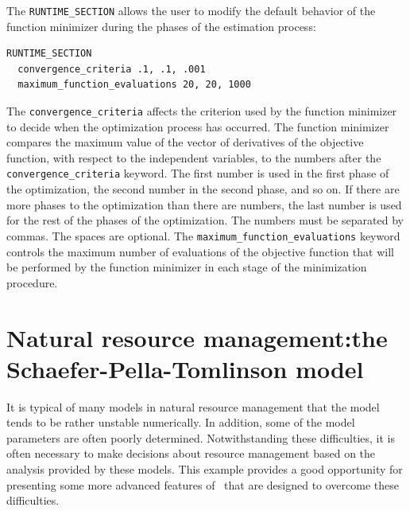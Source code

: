 \documentclass{admbmanual}
\begin{document}
The \texttt{RUNTIME\_SECTION} allows the user to modify the default behavior of
the function minimizer during the phases of the estimation process:
\begin{lstlisting}
RUNTIME_SECTION
  convergence_criteria .1, .1, .001
  maximum_function_evaluations 20, 20, 1000
\end{lstlisting}

The \texttt{convergence\_criteria} affects the criterion used by the function
minimizer to decide when the optimization process has occurred. The function
minimizer compares the maximum value of the vector of derivatives of the
objective function, with respect to the independent variables, to the numbers
after the \texttt{convergence\_criteria} keyword. The first number is used in
the first phase of the optimization, the second number in the second phase, and
so on. If there are more phases to the optimization than there are numbers, the
last number is used for the rest of the phases of the optimization. The numbers
must be separated by commas. The spaces are optional.
The \texttt{maximum\_function\_evaluations} keyword controls the maximum number
of evaluations of the objective function that will be performed by the function
minimizer in each stage of the minimization procedure.

\section{Natural resource management:\br the Schaefer-Pella-Tomlinson model}

It is typical of many models in natural resource management that the model tends
to be rather unstable numerically. In addition, some of the model parameters are
often poorly determined. Notwithstanding these difficulties, it is often
necessary to make decisions about resource management based on the analysis
provided by these models. This example provides a good opportunity for
presenting some more advanced features of \ADM\ that are designed to overcome
these difficulties.
\end{document}

